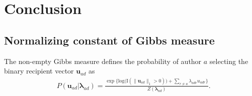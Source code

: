 \documentclass[12pt]{article}
\begin{document}
\section{Conclusion}\label{sec:conclusion}
\newpage


\begin{appendices}
\section{Normalizing constant of Gibbs measure}\label{sec: non-empty Gibbs measure}
The non-empty Gibbs measure \cite{fellows2017removing} defines the probability of author $a$ selecting the binary recipient vector $\boldsymbol{u}_{ad}$ as
\begin{equation*} 
\begin{aligned}
& P(\boldsymbol{u}_{ad}|\boldsymbol{\lambda}_{ad} ) = \frac{\exp\Big\{ \mbox{log}\big(\text{I}(\lVert \boldsymbol{u}_{ad} \rVert_1 > 0)\big) + \sum_{r \neq a} \lambda_{adr}u_{adr} \Big\}}{Z(\boldsymbol{\lambda}_{ad})}.
\end{aligned}
\end{equation*}


\end{appendices}
\end{document}
